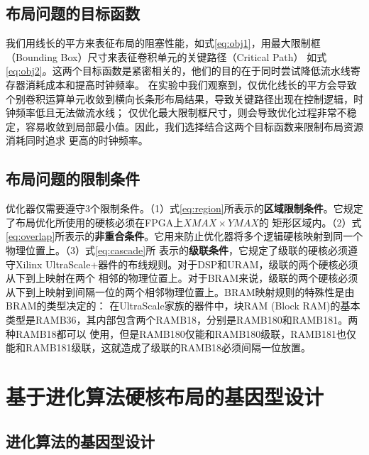 \subsection{布局问题的目标函数}
我们用线长的平方来表征布局的阻塞性能，如式\ref{eq:obj1}，用最大限制框（Bounding Box）尺寸来表征卷积单元的关键路径（Critical Path）
如式\ref{eq:obj2}。这两个目标函数是紧密相关的，他们的目的在于同时尝试降低流水线寄存器消耗成本和提高时钟频率。
在实验中我们观察到，仅优化线长的平方会导致个别卷积运算单元收敛到横向长条形布局结果，导致关键路径出现在控制逻辑，时钟频率低且无法做流水线；
仅优化最大限制框尺寸，则会导致优化过程非常不稳定，容易收敛到局部最小值。因此，我们选择结合这两个目标函数来限制布局资源消耗同时追求
更高的时钟频率。

\subsection{布局问题的限制条件}
优化器仅需要遵守3个限制条件。（1）式\ref{eq:region}所表示的{\bf 区域限制条件}。它规定了布局优化所使用的硬核必须在FPGA上$XMAX \times YMAX$的
矩形区域内。（2）式\ref{eq:overlap}所表示的{\bf 非重合条件}。它用来防止优化器将多个逻辑硬核映射到同一个物理位置上。（3）式\ref{eq:cascade}所
表示的{\bf 级联条件}，它规定了级联的硬核必须遵守Xilinx UltraScale+器件的布线规则。对于DSP和URAM，级联的两个硬核必须从下到上映射在两个
相邻的物理位置上。对于BRAM来说，级联的两个硬核必须从下到上映射到间隔一位的两个相邻物理位置上。BRAM映射规则的特殊性是由BRAM的类型决定的：
在UltraScale家族的器件中，块RAM (Block RAM)的基本类型是RAMB36，其内部包含两个RAMB18，分别是RAMB180和RAMB181。两种RAMB18都可以
使用，但是RAMB180仅能和RAMB180级联，RAMB181也仅能和RAMB181级联，这就造成了级联的RAMB18必须间隔一位放置。


\section{基于进化算法硬核布局的基因型设计}

\subsection{进化算法的基因型设计}

